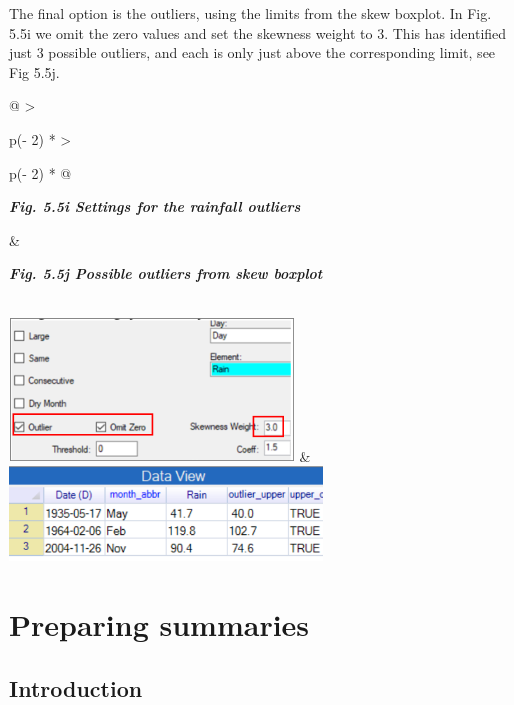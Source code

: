\documentclass[
  letterpaper,
  DIV=11,
  numbers=noendperiod]{scrreprt}
\begin{document}
The final option is the outliers, using the limits from the skew
boxplot. In Fig. 5.5i we omit the zero values and set the skewness
weight to 3. This has identified just 3 possible outliers, and each is
only just above the corresponding limit, see Fig 5.5j.

\begin{longtable}[]{@{}
  >{\raggedright\arraybackslash}p{(\columnwidth - 2\tabcolsep) * }
  >{\raggedright\arraybackslash}p{(\columnwidth - 2\tabcolsep) * }@{}}
\toprule\noalign{}
\begin{minipage}[b]{\linewidth}\raggedright
\textbf{\emph{Fig. 5.5i Settings for the rainfall outliers}}
\end{minipage} & \begin{minipage}[b]{\linewidth}\raggedright
\textbf{\emph{Fig. 5.5j Possible outliers from skew boxplot}}
\end{minipage} \\
\midrule\noalign{}
\endhead
\bottomrule\noalign{}
\endlastfoot
\includegraphics[width=2.97863in,height=1.49742in]{figures/Fig5.5i.png}
&
\includegraphics[width=3.27232in,height=0.99566in]{figures/Fig5.5j.png} \\
\end{longtable}


\chapter{Preparing summaries}\label{preparing-summaries}

\section{Introduction}\label{introduction-4}
\end{document}
